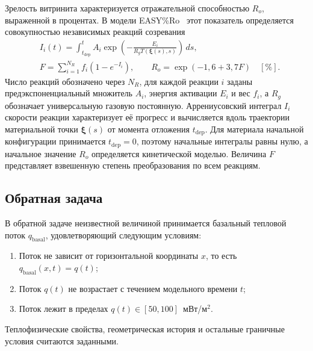 Зрелость витринита характеризуется отражательной способностью $R_o$, выраженной в процентах. В модели EASY\%Ro~\cite{sweeney1990} этот показатель определяется совокупностью независимых реакций созревания
\begin{equation}
  \begin{aligned}
    &I_i(t) = \int_{t_{\mathrm{dep}}}^{t}
    A_i \exp\left(-\frac{E_i}{R_g T(\boldsymbol\xi(s), s)}\right)\,ds,
    \\
    &F = \sum_{i=1}^{N_R} f_i(1 - e^{-I_i}),\qquad
    R_o = \exp(-1{,}6 + 3{,}7F)\quad[\%].
  \end{aligned}
\end{equation}
Число реакций обозначено через $N_R$, для каждой реакции $i$ заданы предэкспоненциальный множитель $A_i$, энергия активации $E_i$ и вес $f_i$, а $R_g$ обозначает универсальную газовую постоянную. Аррениусовский интеграл $I_i$ скорости реакции характеризует её прогресс и вычисляется вдоль траектории материальной точки $\boldsymbol\xi(s)$ от момента отложения $t_{\mathrm{dep}}$. Для материала начальной конфигурации принимается $t_{\mathrm{dep}}=0$, поэтому начальные интегралы равны нулю, а начальное значение $R_o$ определяется кинетической моделью. Величина $F$ представляет взвешенную степень преобразования по всем реакциям.

\subsection{Обратная задача}

В обратной задаче неизвестной величиной принимается базальный тепловой поток $q_{\mathrm{basal}}$, удовлетворяющий следующим условиям:
\begin{enumerate}
  \item Поток не зависит от горизонтальной координаты $x$, то есть $q_{\mathrm{basal}}(x,t) = q(t)$;
  \item Поток $q(t)$ не возрастает с течением модельного времени $t$;
  \item Поток лежит в пределах $q(t) \in [50,100]$~мВт/м$^2$.
\end{enumerate}
Теплофизические свойства, геометрическая история и остальные граничные условия считаются заданными.

